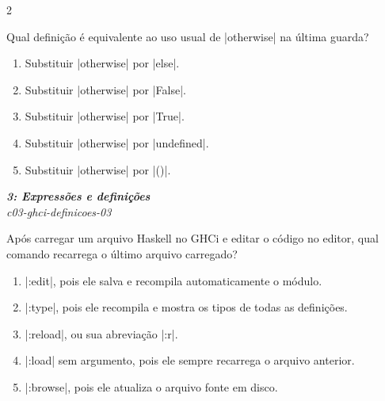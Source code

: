 \documentclass[a4paper,10pt,brazil]{article}
\begin{document}
\begin{multicols}{2}
\begin{flushright}
\end{flushright}
Qual definição é equivalente ao uso usual de \haskellinline|otherwise| na última guarda?

\begin{enumerate}
  \item Substituir \haskellinline|otherwise| por \haskellinline|else|.

  \item Substituir \haskellinline|otherwise| por \haskellinline|False|.

  \item Substituir \haskellinline|otherwise| por \haskellinline|True|.

  \item Substituir \haskellinline|otherwise| por \haskellinline|undefined|.

  \item Substituir \haskellinline|otherwise| por \haskellinline|()|.


\end{enumerate}

\begin{flushright}
  \footnotesize
  \textit{\textbf{3: Expressões e definições}}\\
  \textit{c03-ghci-definicoes-03}\\

\end{flushright}
Após carregar um arquivo Haskell no GHCi e editar o código no editor, qual comando recarrega o último arquivo carregado?

\begin{enumerate}
  \item \haskellinline|:edit|, pois ele salva e recompila automaticamente o módulo.

  \item \haskellinline|:type|, pois ele recompila e mostra os tipos de todas as definições.

  \item \haskellinline|:reload|, ou sua abreviação \haskellinline|:r|.

  \item \haskellinline|:load| sem argumento, pois ele sempre recarrega o arquivo anterior.

  \item \haskellinline|:browse|, pois ele atualiza o arquivo fonte em disco.


\end{enumerate}


\end{multicols}
\end{document}
